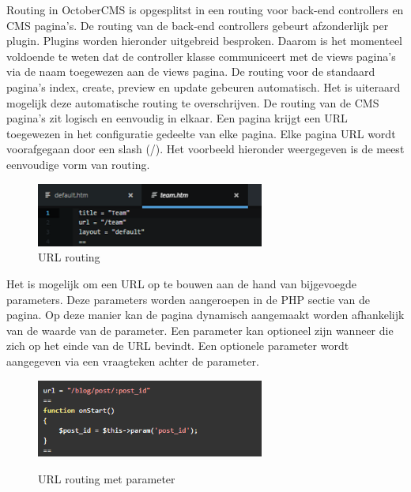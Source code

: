 Routing in OctoberCMS is opgesplitst in een routing voor back-end controllers en CMS pagina's. De routing van de back-end controllers gebeurt afzonderlijk per plugin. Plugins worden hieronder uitgebreid besproken. Daarom is het momenteel voldoende te weten dat de controller klasse communiceert met de views pagina's via de naam toegewezen aan de views pagina. De routing voor de standaard pagina's index, create, preview en update gebeuren automatisch. Het is uiteraard mogelijk deze automatische routing te overschrijven.
\newline\newline
De routing van de CMS pagina's zit logisch en eenvoudig in elkaar. Een pagina krijgt een URL toegewezen in het configuratie gedeelte van elke pagina. Elke pagina URL wordt voorafgegaan door een slash (/). Het voorbeeld hieronder weergegeven is de meest eenvoudige vorm van routing.

\begin{figure}[!ht]
  \includegraphics[width=75mm]{img/oc-routing-url.png}
  \centering
  \caption{URL routing}
  \label{fig:Url routing}
\end{figure}

\noindent
Het is mogelijk om een URL op te bouwen aan de hand van bijgevoegde parameters. Deze parameters worden aangeroepen in de PHP sectie van de pagina. Op deze manier kan de pagina dynamisch aangemaakt worden afhankelijk van de waarde van de parameter. Een parameter kan optioneel zijn wanneer die zich op het einde van de URL bevindt. Een optionele parameter wordt aangegeven via een vraagteken achter de parameter.

\begin{figure}[!ht]
  \includegraphics[width=75mm]{img/oc-routing-url-parameter.png}
  \centering
  \caption{URL routing met parameter}
  \label{fig:Url routing met parameter}
  \citep{BobkovAlexey2016OctoberCMSDocumentation}
\end{figure}


